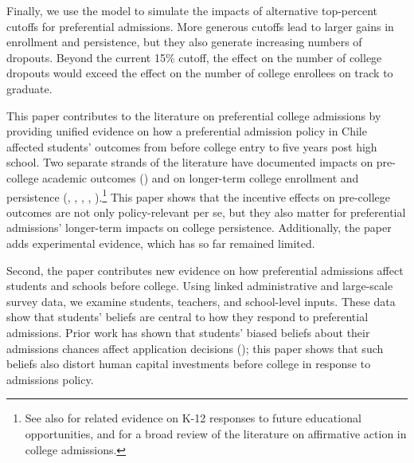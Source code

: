 Finally, we use the model to simulate the impacts of alternative top-percent cutoffs for preferential admissions. More generous cutoffs lead to larger gains in enrollment and persistence, but they also generate increasing numbers of dropouts. Beyond the current 15\% cutoff, the effect on the number of college dropouts would exceed the effect on the number of college enrollees on track to graduate.\par 


This paper contributes to the literature on preferential college admissions by providing unified evidence on how a preferential admission policy in Chile affected students' outcomes from before college entry to five years post high school. Two separate strands of the literature have documented impacts on pre-college academic outcomes (\citealp{golightly2019does,akhtari2024affirmative,khanna2020does}) and on longer-term college enrollment and persistence (\citealp{long2010policy}, \citealp{niu2010impact}, \citealp{daugherty2014percent}, \citealp{bleemer2021top}, \citealp{black2023winners}).\footnote{See also \citealp{hastings2012effect} for related evidence on K-12 responses to future educational opportunities, and \citealp{arcidiacono2015affirmative} for a broad review of the literature on affirmative action in college admissions.} This paper shows that the incentive effects on pre-college outcomes are not only policy-relevant per se, but they also matter for preferential admissions' longer-term impacts on college persistence. Additionally, the paper adds experimental evidence, which has so far remained limited.\par 

Second, the paper contributes new evidence on how preferential admissions affect students and schools before college. Using linked administrative and large-scale survey data, we examine students, teachers, and school-level inputs. These data show that students’ beliefs are central to how they respond to preferential admissions. Prior work has shown that students’ biased beliefs about their admissions chances affect application decisions (\citealp{larroucau2024college, hakimov2025confidence}); this paper shows that such beliefs also distort human capital investments before college in response to admissions policy.\par 

